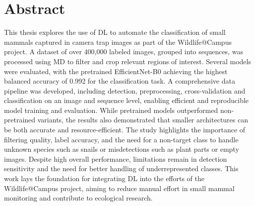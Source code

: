 

\vspace*{\fill}

\section*{Abstract}
\label{abstract}

This thesis explores the use of \ac{DL} to automate the classification of small mammals captured in camera trap images as part of the Wildlife@Campus project.
A dataset of over 400,000 labeled images, grouped into sequences, was processed using \acl{MD} to filter and crop relevant regions of interest.
Several models were evaluated, with the pretrained EfficientNet-B0 achieving the highest balanced accuracy of 0.992 for the classification task.
A comprehensive data pipeline was developed, including detection, preprocessing, cross-validation and classification on an image and sequence level, enabling efficient and reproducible model training and evaluation.
While pretrained models outperformed non-pretrained variants, the results also demonstrated that smaller architectures can be both accurate and resource-efficient.
The study highlights the importance of filtering quality, label accuracy, and the need for a non-target class to handle unknown species such as snails or misdetections such as plant parts or empty images.
Despite high overall performance, limitations remain in detection sensitivity and the need for better handling of underrepresented classes.
This work lays the foundation for integrating \ac{DL} into the efforts of the Wildlife@Campus project, aiming to reduce manual effort in small mammal monitoring and contribute to ecological research.

\vspace*{\fill}
